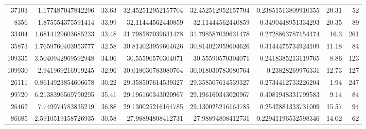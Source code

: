 \documentclass[14pt]{article} %
\begin{document}
\begin{landscape}
\begin{spacing}{1.0}
\begin{table}[h]
\begin{tabular}{|r|r|r|r|r|r|r|r|}
37103&1.177487047842296&33.63&32.452512952157704&32.452512952157704&0.23851513809910355&20.31&52\\
8356&1.875554375591414&33.99&32.11444562440859&32.11444562440859&0.3490448951334293&20.35&89\\
33404&1.6814129603685233&33.48&31.798587039631478&31.798587039631478&0.2728863787154474&16.3&261\\
35873&1.7659760403953777&32.58&30.814023959604626&30.814023959604626&0.3144475734924109&11.18&84\\
109335&3.5040942969592948&34.06&30.55590570304071&30.55590570304071&0.2418385213119765&8.86&123\\
109930&2.941969216919245&32.96&30.018030783080764&30.018030783080764&0.23828269976331&12.73&127\\
26111&0.8614923854606678&30.22&29.358507614539327&29.358507614539327&0.2734412733226204&1.94&247\\
99720&6.2138396569790295&35.41&29.196160343020967&29.196160343020967&0.4081948331799583&9.14&84\\
26462&7.749974783835219&36.88&29.130025216164785&29.130025216164785&0.2542881333731009&15.57&94\\
86685&2.5910519158726935&30.58&27.98894808412731&27.98894808412731&0.22941196532598346&14.02&62\\
\hline 
\end{tabular}
\end{table}

\newpage


\end{spacing}
\end{landscape}
\end{document}
